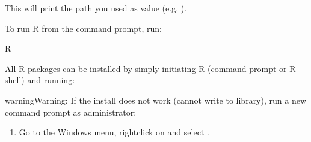 \documentclass[letterpaper,10pt,english]{sphinxmanual}
\begin{document}
This will print the path you used as value (e.g. ).

To run R from the command prompt, run:

\begin{sphinxVerbatim}[commandchars=\\\{\}]
\PYGZgt{} R
\end{sphinxVerbatim}

All R packages can be installed by simply initiating R (command prompt or R shell) and running:

\begin{sphinxVerbatim}[commandchars=\\\{\}]
   
   
\end{sphinxVerbatim}

\begin{sphinxadmonition}{warning}{Warning:}
If the install does not work (cannot write to library), run a new command prompt as administrator:
\end{sphinxadmonition}
\begin{enumerate}
%
\item {} 
Go to the Windows menu, right\sphinxhyphen{}click on  and select .

\end{enumerate}
\end{document}
